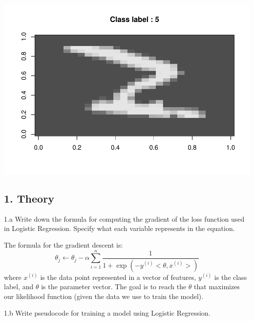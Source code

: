 \documentclass[]{article}
\begin{document}
\includegraphics{hw3_files/figure-latex/unnamed-chunk-9-1.pdf}

\subsection{1. Theory}\label{theory}

1.a Write down the formula for computing the gradient of the loss
function used in Logistic Regression. Specify what each variable
represents in the equation.

The formula for the gradient descent is: \[
\theta_j \leftarrow \theta_j - \alpha \sum_{i=1}^{n} \frac{1}{1 + \exp(-y^{(i)} <\theta, x^{(i)}> )}
\] where \(x^{(i)}\) is the data point represented in a vector of
features, \(y^{(i)}\) is the class label, and \(\theta\) is the
parameter vector. The goal is to reach the \(\theta\) that maximizes our
likelihood function (given the data we use to train the model).

1.b Write pseudocode for training a model using Logistic Regression.

\end{document}
